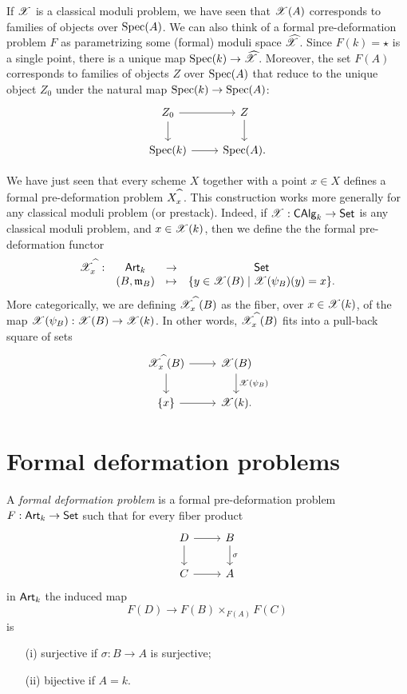 \documentclass[11pt]{amsart}
\begin{document}
\begin{rmk}
If $\sX$ is a classical moduli problem, we have seen that $\sX(A)$ corresponds to families of objects over ${\rm Spec}(A)$. 
We can also think of a formal pre-deformation problem $F$ as parametrizing some (formal) moduli space $\Hat{\sX}$.
Since $F(k) = \star$ is a single point, there is a unique map ${\rm Spec}(k) \to \Hat{\sX}$. 
Moreover, the set $F(A)$ corresponds to families of objects $Z$ over ${\rm Spec}(A)$ that reduce to the unique object $Z_0$ under the natural map ${\rm Spec}(k) \to {\rm Spec}(A)$:
\[
\begin{tikzcd}
Z_0 \ar[r] \ar[d] & Z \ar[d] \\
{\rm Spec}(k) \ar[r] & {\rm Spec}(A) .
\end{tikzcd}
\]
\end{rmk}

\begin{eg}
We have just seen that every scheme $X$ together with a point $x \in X$ defines a formal pre-deformation problem $X^{\Hat{\;\;}}_x$. 
This construction works more generally for any classical moduli problem (or prestack). 
Indeed, if $\sX : \CAlg_k \to \Set$ is any classical moduli problem, and $x \in \sX(k)$, then we define the the formal pre-deformation functor
\[
\begin{array}{cccc}
\sX^{\Hat{\;\;}}_x : & \Art_k & \to & \Set \\
& (B,\fm_B) & \mapsto & \{y \in \sX(B) \; | \; \sX(\psi_B)(y) = x\} . 
\end{array}
\]
More categorically, we are defining $\sX^{\Hat{\;\;}}_x(B)$ as the fiber, over $x \in \sX(k)$, of the map $\sX(\psi_B) : \sX(B) \to \sX(k)$. 
In other words, $\sX^{\Hat{\;\;}}_x(B)$ fits into a pull-back square of sets
\[
\begin{tikzcd}
\sX^{\Hat{\;\;}}_x(B) \ar[d] \ar[r] & \sX(B) \ar[d, "\sX(\psi_B)"] \\
\{x\} \ar[r] & \sX(k) .
\end{tikzcd}
\]
\end{eg}

\section{Formal deformation problems}

\begin{dfn}\label{dfn: def}
A {\em formal deformation problem} is a formal pre-deformation problem $F : \Art_k \to \Set$ such that for every fiber product
\[
\begin{tikzcd}
D \ar[d] \ar[r] & B \ar[d, "\sigma"] \\
C \ar[r] & A 
\end{tikzcd}
\]
in $\Art_k$ the induced map
\[
F(D) \to F(B) \times_{F(A)} F(C)
\]
is
\begin{enumerate}
\item[(i)] surjective if $\sigma : B \to A$ is surjective;
\item[(ii)] bijective if $A = k$.
\end{enumerate}
\end{dfn}
\end{document}
